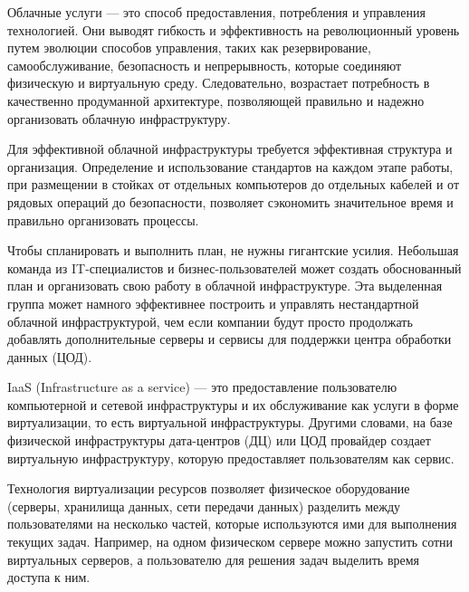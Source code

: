 Облачные услуги --- это способ предоставления, потребления и управления технологией.
Они выводят гибкость и эффективность на революционный уровень путем эволюции способов управления, таких как резервирование, самообслуживание, безопасность и непрерывность, которые соединяют физическую и виртуальную среду.
Следовательно, возрастает потребность в качественно продуманной архитектуре, позволяющей правильно и надежно организовать облачную инфраструктуру.

Для эффективной облачной инфраструктуры требуется эффективная структура и организация.
Определение и использование стандартов на каждом этапе работы, при размещении в стойках от отдельных компьютеров до отдельных кабелей и от рядовых операций до безопасности, позволяет сэкономить значительное время и правильно организовать процессы.

Чтобы спланировать и выполнить план, не нужны гигантские усилия.
Небольшая команда из IT-специалистов и бизнес-пользователей может создать обоснованный план и организовать свою работу в облачной инфраструктуре.
Эта выделенная группа может намного эффективнее построить и управлять нестандартной облачной инфраструктурой, чем если компании будут просто продолжать добавлять дополнительные серверы и сервисы для поддержки центра обработки данных (ЦОД).

IaaS (Infrastructure as a service) --- это предоставление пользователю компьютерной и сетевой инфраструктуры и их обслуживание как услуги в форме виртуализации, то есть виртуальной инфраструктуры.
Другими словами, на базе физической инфраструктуры дата-центров (ДЦ) или ЦОД провайдер создает виртуальную инфраструктуру, которую предоставляет пользователям как сервис.

Технология виртуализации ресурсов позволяет физическое оборудование (серверы, хранилища данных, сети передачи данных) разделить между пользователями на несколько частей, которые используются ими для выполнения текущих задач.
Например, на одном физическом сервере можно запустить сотни виртуальных серверов, а пользователю для решения задач выделить время доступа к ним.

\clearpage
